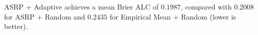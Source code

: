 ASRP + Adaptive achieves a mean Brier ALC of $0.1987$, compared with $0.2008$ for ASRP + Random and $0.2435$ for Empirical Mean + Random (lower is better).
